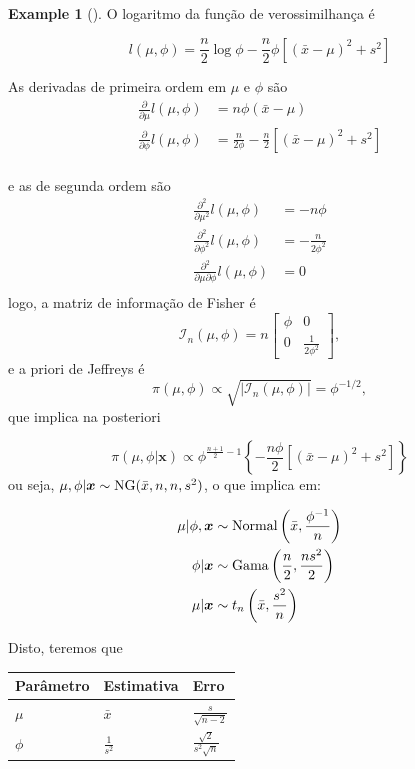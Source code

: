\documentclass[
  letterpaper,
  DIV=11,
  numbers=noendperiod]{scrreprt}
\theoremstyle{definition}
\theoremstyle{plain}
\theoremstyle{definition}
\newtheorem{example}{Example}[chapter]
\theoremstyle{remark}
\begin{document}
\begin{example}[]
O logaritmo da função de verossimilhança é

\[l(\mu,\phi)=\frac{n}{2}\log\phi -\frac{n}{2}\phi\left[(\bar{x}-\mu)^2 + s^2\right]\]

As derivadas de primeira ordem em \(\mu\) e \(\phi\) são \[\begin{align}
\frac{\partial}{\partial \mu}l(\mu,\phi)&=n\phi(\bar{x}-\mu)\\
\frac{\partial}{\partial \phi}l(\mu,\phi)&=\frac{n}{2\phi}-\frac{n}{2}\left[(\bar{x}-\mu)^2 + s^2\right]\\
\end{align}\]

e as de segunda ordem são \[\begin{align}
\frac{\partial^2}{\partial \mu^2}l(\mu,\phi)&=-n\phi\\
\frac{\partial^2}{\partial \phi^2}l(\mu,\phi)&=-\frac{n}{2\phi^2}\\
\frac{\partial^2}{\partial \mu\partial \phi}l(\mu,\phi)&=0\\
\end{align}
\] logo, a matriz de informação de Fisher é
\[\mathcal{I}_n(\mu,\phi)=n\left[\begin{array}{cc}\phi & 0 \\0 & \frac{1}{2\phi^2}\end{array}\right],\]
e a priori de Jeffreys é
\[\pi(\mu,\phi)\propto \sqrt{|\mathcal{I}_n(\mu,\phi)|}=\phi^{-1/2},\]
que implica na posteriori

\[\pi(\mu,\phi|\boldsymbol{x})\propto \phi^{\frac{n+1}{2}-1}\left\{-\frac{n\phi}{2}\left[(\bar{x}-\mu)^2 +s^2 \right]\right\}\]
ou seja, \(\mu,\phi|\boldsymbol{x}\sim\hbox{NG}(\bar{x},n,n,s^2)\), o
que implica em:

\[\begin{align}
\mu|\phi,\boldsymbol{x}&\sim\hbox{Normal}\left(\bar{x},\frac{\phi^{-1}}{n}\right)\\
\phi|\boldsymbol{x}&\sim\hbox{Gama}\left(\frac{n}{2},\frac{ns^2}{2}\right)\\
\mu|\boldsymbol{x}&\sim t_{n}\left(\bar{x},\frac{s^2}{n}\right)
\end{align}\]

Disto, teremos que

\begin{longtable}[]{@{}lll@{}}
\toprule\noalign{}
Parâmetro & Estimativa & Erro \\
\midrule\noalign{}
\endhead
\bottomrule\noalign{}
\endlastfoot
\(\mu\) & \(\bar{x}\) & \(\frac{s}{\sqrt{n-2}}\) \\
\(\phi\) & \(\frac{1}{s^{2}}\) & \(\frac{\sqrt{2}}{s^2\sqrt{n}}\) \\
\end{longtable}


\end{example}
\end{document}
